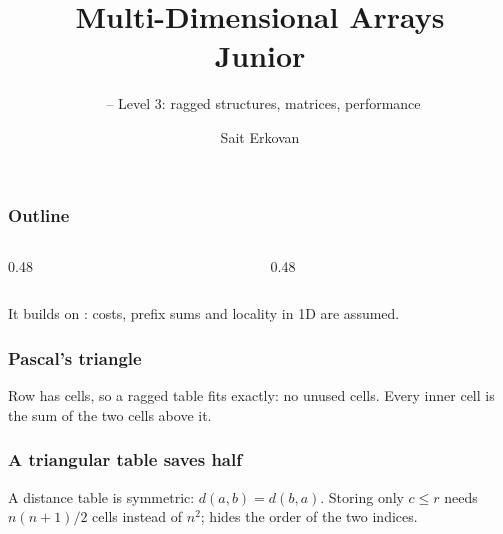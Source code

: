 \documentclass[aspectratio=169,10pt,compress]{beamer}
\title[Arrays ND: Junior]{
	Multi-Dimensional Arrays\\
	Junior
}
\subtitle{
	\cisOOO\ -- Level 3: ragged structures, matrices, performance
}
\author[Erkovan]{Sait Erkovan}
\institute[FCIS]{
	Faculty of Computer and Information Sciences\\
	Yeditepe University
}
\date{{\tiny \hbTimeStamp}}
\begin{document}
\begin{frame}[t,fragile]
	\titlepage
\end{frame}




\begin{frame}[t,fragile] \frametitle{Outline}
	\begin{columns}[T]
		\begin{column}{0.48\textwidth}
			\tableofcontents[sections={1-3}, hideallsubsections]
		\end{column}
		\begin{column}{0.48\textwidth}
			\tableofcontents[sections={4-5}, hideallsubsections]
		\end{column}
	\end{columns}

	\vspace{1em}
	\small It builds on : costs, prefix sums and locality in 1D are assumed.
\end{frame}








\begin{frame}[t,fragile] \frametitle{Pascal's triangle}

	\footnotesize Row  has  cells, so a ragged table fits exactly: no unused cells.
	Every inner cell is the sum of the two cells above it.
\end{frame}




\begin{frame}[t,fragile] \frametitle{A triangular table saves half}

	\footnotesize A distance table is symmetric: $d(a, b) = d(b, a)$. Storing only $c \le r$ needs
	$n(n + 1)/2$ cells instead of $n^{2}$;  hides the order of the two indices.
\end{frame}
\end{document}
